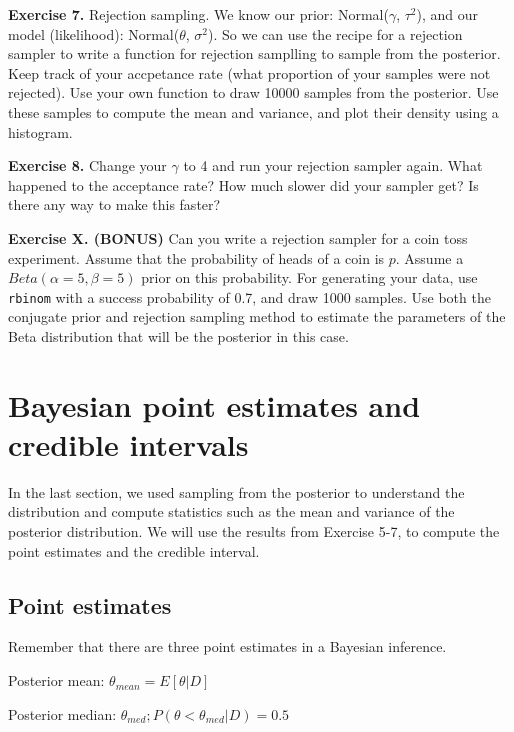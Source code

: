 \documentclass[
]{book}
\begin{document}
\textbf{Exercise 7.} Rejection sampling. We know our prior: Normal(\(\gamma\), \(\tau^2\)), and our model (likelihood): Normal(\(\theta\), \(\sigma^2\)). So we can use the recipe for a rejection sampler to write a function for rejection samplling to sample from the posterior. Keep track of your accpetance rate (what proportion of your samples were not rejected). Use your own function to draw 10000 samples from the posterior. Use these samples to compute the mean and variance, and plot their density using a histogram.

\textbf{Exercise 8.} Change your \(\gamma\) to 4 and run your rejection sampler again. What happened to the acceptance rate? How much slower did your sampler get? Is there any way to make this faster?

\textbf{Exercise X. (BONUS)} Can you write a rejection sampler for a coin toss experiment. Assume that the probability of heads of a coin is \(p\). Assume a \(Beta(\alpha=5, \beta=5)\) prior on this probability. For generating your data, use \texttt{rbinom} with a success probability of 0.7, and draw 1000 samples. Use both the conjugate prior and rejection sampling method to estimate the parameters of the Beta distribution that will be the posterior in this case.

\hypertarget{bayesian-point-estimates-and-credible-intervals}{%
\section{Bayesian point estimates and credible intervals}\label{bayesian-point-estimates-and-credible-intervals}}

In the last section, we used sampling from the posterior to understand the distribution and compute statistics such as the mean and variance of the posterior distribution. We will use the results from Exercise 5-7, to compute the point estimates and the credible interval.

\hypertarget{point-estimates}{%
\subsection{Point estimates}\label{point-estimates}}

Remember that there are three point estimates in a Bayesian inference.

Posterior mean: \(\theta_{mean} = E[\theta|D]\)

Posterior median: \(\theta_{med}; P(\theta < \theta_{med} | D) = 0.5\)
\end{document}
